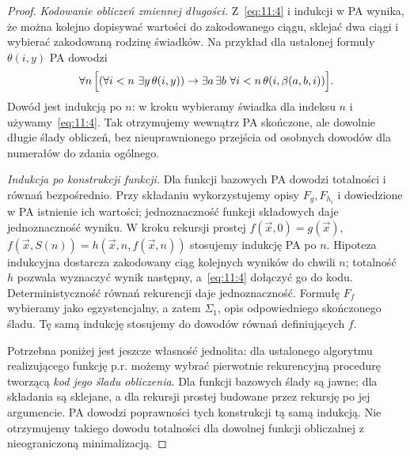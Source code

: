 \begin{proof}
\emph{Kodowanie obliczeń zmiennej długości.} Z~\eqref{eq:11:4} i indukcji w PA wynika, że można kolejno dopisywać wartości do zakodowanego ciągu, sklejać dwa ciągi i wybierać zakodowaną rodzinę świadków. Na przykład dla ustalonej formuły $\theta(i,y)$ PA dowodzi
\[
\forall n\,\Bigl[(\forall i<n\ \exists y\,\theta(i,y))
\to\exists a\,\exists b\ \forall i<n\,\theta(i,\beta(a,b,i))\Bigr].
\]
Dowód jest indukcją po $n$: w kroku wybieramy świadka dla indeksu $n$ i używamy~\eqref{eq:11:4}. Tak otrzymujemy wewnątrz PA skończone, ale dowolnie długie ślady obliczeń, bez nieuprawnionego przejścia od osobnych dowodów dla numerałów do zdania ogólnego.

\emph{Indukcja po konstrukcji funkcji.} Dla funkcji bazowych PA dowodzi totalności i równań bezpośrednio. Przy składaniu wykorzystujemy opisy $F_g,F_{h_i}$ i dowiedzione w PA istnienie ich wartości; jednoznaczność funkcji składowych daje jednoznaczność wyniku. W kroku rekursji prostej
$f(\vec x,0)=g(\vec x)$,
$f(\vec x,S(n))=h(\vec x,n,f(\vec x,n))$
stosujemy indukcję PA po $n$. Hipoteza indukcyjna dostarcza zakodowany ciąg kolejnych wyników do chwili $n$; totalność $h$ pozwala wyznaczyć wynik następny, a~\eqref{eq:11:4} dołączyć go do kodu. Deterministyczność równań rekurencji daje jednoznaczność. Formułę $F_f$ wybieramy jako egzystencjalny, a zatem $\Sigma_1$, opis odpowiedniego skończonego śladu. Tę samą indukcję stosujemy do dowodów równań definiujących $f$.

Potrzebna poniżej jest jeszcze własność jednolita: dla ustalonego algorytmu realizującego funkcję p.r. możemy wybrać pierwotnie rekurencyjną procedurę tworzącą \emph{kod jego śladu obliczenia}. Dla funkcji bazowych ślady są jawne; dla składania są sklejane, a dla rekursji prostej budowane przez rekursję po jej argumencie. PA dowodzi poprawności tych konstrukcji tą samą indukcją. Nie otrzymujemy takiego dowodu totalności dla dowolnej funkcji obliczalnej z nieograniczoną minimalizacją.
\end{proof}


